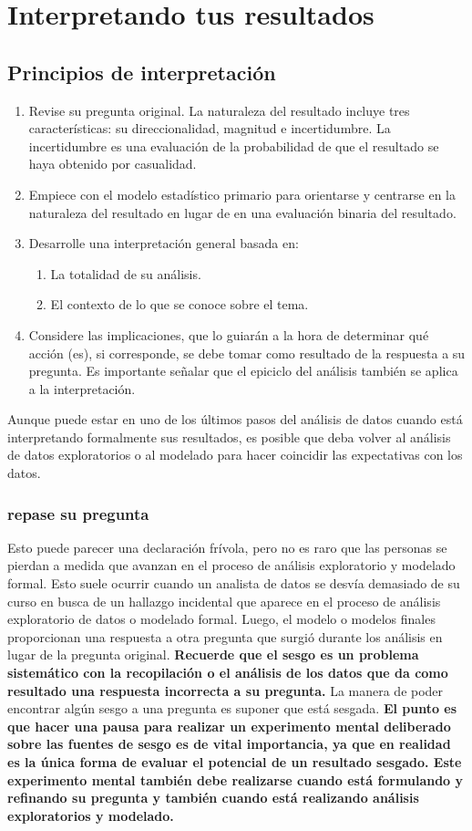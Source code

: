 \documentclass[10pt]{book}
\begin{document}
\chapter{Interpretando tus resultados}
    \section{Principios de interpretación}
    \begin{enumerate}[\bfseries 1.]
	\item Revise su pregunta original. La naturaleza del resultado incluye tres características: su direccionalidad, magnitud e incertidumbre. La incertidumbre es una evaluación de la probabilidad de que el resultado se haya obtenido por casualidad.
	\item Empiece con el modelo estadístico primario para orientarse y centrarse en la naturaleza del resultado en lugar de en una evaluación binaria del resultado.
	\item Desarrolle una interpretación general basada en:
	    \begin{enumerate}[\bfseries (a)]
		\item La totalidad de su análisis.
		\item El contexto de lo que se conoce sobre el tema.
	    \end{enumerate}
	\item Considere las implicaciones, que lo guiarán a la hora de determinar qué acción (es), si corresponde, se debe tomar como resultado de la respuesta a su pregunta. Es importante señalar que el epiciclo del análisis también se aplica a la interpretación.
    \end{enumerate}
    Aunque puede estar en uno de los últimos pasos del análisis de datos cuando está interpretando formalmente sus resultados, es posible que deba volver al análisis de datos exploratorios o al modelado para hacer coincidir las expectativas con los datos.
	\subsection{repase su pregunta}
	Esto puede parecer una declaración frívola, pero no es raro que las personas se pierdan a medida que avanzan en el proceso de análisis exploratorio y modelado formal. Esto suele ocurrir cuando un analista de datos se desvía demasiado de su curso en busca de un hallazgo incidental que aparece en el proceso de análisis exploratorio de datos o modelado formal. Luego, el modelo o modelos finales proporcionan una respuesta a otra pregunta que surgió durante los análisis en lugar de la pregunta original. \textbf{Recuerde que el sesgo es un problema sistemático con la recopilación o el análisis de los datos que da como resultado una respuesta incorrecta a su pregunta.} La manera de poder encontrar algún sesgo a una pregunta es suponer que está sesgada. \textbf{El punto es que hacer una pausa para realizar un experimento mental deliberado sobre las fuentes de sesgo es de vital importancia, ya que en realidad es la única forma de evaluar el potencial de un resultado sesgado. Este experimento mental también debe realizarse cuando está formulando y refinando su pregunta y también cuando está realizando análisis exploratorios y modelado.}
\end{document}
